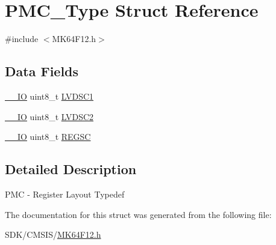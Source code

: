 \hypertarget{struct_p_m_c___type}{}\section{P\+M\+C\+\_\+\+Type Struct Reference}
\label{struct_p_m_c___type}


{\ttfamily \#include $<$M\+K64\+F12.\+h$>$}

\subsection*{Data Fields}
\begin{DoxyCompactItemize}
\item 
\mbox{\hyperlink{core__cm4_8h_aec43007d9998a0a0e01faede4133d6be}{\+\_\+\+\_\+\+IO}} uint8\+\_\+t \mbox{\hyperlink{group___v_r_e_f___peripheral___access___layer_ga183606de7c919c44520d5625860eaebd}{L\+V\+D\+S\+C1}}
\item 
\mbox{\hyperlink{core__cm4_8h_aec43007d9998a0a0e01faede4133d6be}{\+\_\+\+\_\+\+IO}} uint8\+\_\+t \mbox{\hyperlink{group___v_r_e_f___peripheral___access___layer_ga22e5df8ec02f6f9fb1aae7aab10f7ac6}{L\+V\+D\+S\+C2}}
\item 
\mbox{\hyperlink{core__cm4_8h_aec43007d9998a0a0e01faede4133d6be}{\+\_\+\+\_\+\+IO}} uint8\+\_\+t \mbox{\hyperlink{group___v_r_e_f___peripheral___access___layer_gac2fc2acedfe2248d41dfbaaccd2a582e}{R\+E\+G\+SC}}
\end{DoxyCompactItemize}


\subsection{Detailed Description}
P\+MC -\/ Register Layout Typedef 

The documentation for this struct was generated from the following file\+:\begin{DoxyCompactItemize}
\item 
S\+D\+K/\+C\+M\+S\+I\+S/\mbox{\hyperlink{_m_k64_f12_8h}{M\+K64\+F12.\+h}}\end{DoxyCompactItemize}
